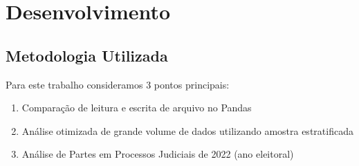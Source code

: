 \section{Desenvolvimento}

\subsection{Metodologia Utilizada}

Para este trabalho consideramos 3 pontos principais:
\begin{enumerate}
	\item Comparação de leitura e escrita de arquivo no Pandas
	\item Análise otimizada de grande volume de dados utilizando amostra estratificada
	\item Análise de Partes em Processos Judiciais de 2022 (ano eleitoral)
\end{enumerate}   

